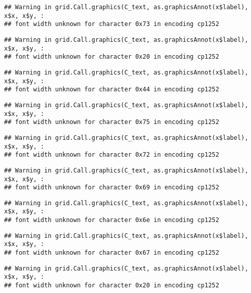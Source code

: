 \documentclass[
]{article}
\begin{document}
\begin{verbatim}
## Warning in grid.Call.graphics(C_text, as.graphicsAnnot(x$label), x$x, x$y, :
## font width unknown for character 0x73 in encoding cp1252
\end{verbatim}

\begin{verbatim}
## Warning in grid.Call.graphics(C_text, as.graphicsAnnot(x$label), x$x, x$y, :
## font width unknown for character 0x20 in encoding cp1252
\end{verbatim}

\begin{verbatim}
## Warning in grid.Call.graphics(C_text, as.graphicsAnnot(x$label), x$x, x$y, :
## font width unknown for character 0x44 in encoding cp1252
\end{verbatim}

\begin{verbatim}
## Warning in grid.Call.graphics(C_text, as.graphicsAnnot(x$label), x$x, x$y, :
## font width unknown for character 0x75 in encoding cp1252
\end{verbatim}

\begin{verbatim}
## Warning in grid.Call.graphics(C_text, as.graphicsAnnot(x$label), x$x, x$y, :
## font width unknown for character 0x72 in encoding cp1252
\end{verbatim}

\begin{verbatim}
## Warning in grid.Call.graphics(C_text, as.graphicsAnnot(x$label), x$x, x$y, :
## font width unknown for character 0x69 in encoding cp1252
\end{verbatim}

\begin{verbatim}
## Warning in grid.Call.graphics(C_text, as.graphicsAnnot(x$label), x$x, x$y, :
## font width unknown for character 0x6e in encoding cp1252
\end{verbatim}

\begin{verbatim}
## Warning in grid.Call.graphics(C_text, as.graphicsAnnot(x$label), x$x, x$y, :
## font width unknown for character 0x67 in encoding cp1252
\end{verbatim}

\begin{verbatim}
## Warning in grid.Call.graphics(C_text, as.graphicsAnnot(x$label), x$x, x$y, :
## font width unknown for character 0x20 in encoding cp1252
\end{verbatim}
\end{document}
